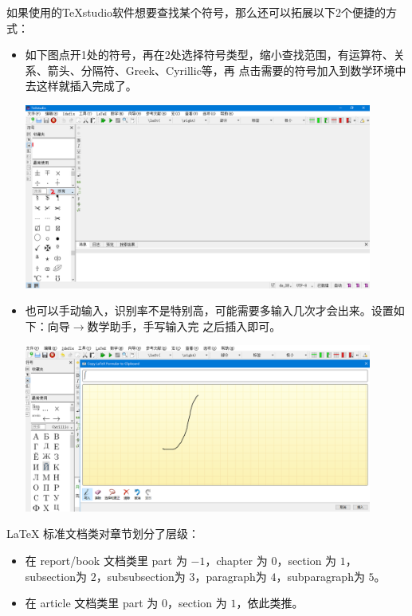 如果使用的TeXstudio软件想要查找某个符号，那么还可以拓展以下2个便捷的方式：
\begin{itemize}
\item 如下图点开1处的符号，再在2处选择符号类型，缩小查找范围，有运算符、关系、箭头、分隔符、Greek、Cyrillic等，再
  点击需要的符号加入到数学环境中去这样就插入完成了。

  \includegraphics[width=0.9\textwidth]{../images/5.png}
\item 也可以手动输入，识别率不是特别高，可能需要多输入几次才会出来。设置如下：向导$\rightarrow$数学助手，手写输入完
  之后插入即可。

  \includegraphics[width=0.9\textwidth]{../images/image.png}
\end{itemize}





\LaTeX{} 标准文档类对章节划分了层级：
\begin{itemize}
\item 在 report/book 文档类里 part 为 $-1$，chapter 为 $0$，section 为 $1$，
  subsection为 $2$，subsubsection为 $3$，paragraph为 $4$，subparagraph为 $5$。
\item 在 article 文档类里 part 为 $0$，section 为 $1$，依此类推。
\end{itemize}


